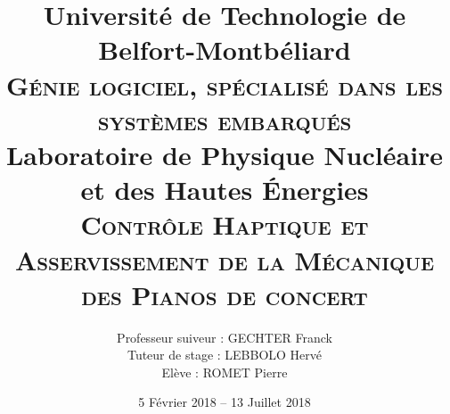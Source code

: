 \documentclass[french,a4paper,12pt]{report}
\begin{document}
\title{	Université de Technologie de Belfort-Montbéliard \\
		{\large \textsc{Génie logiciel, spécialisé dans les systèmes embarqués }} \\
		\vspace{1cm}
		Laboratoire de Physique Nucléaire et des Hautes Énergies \\
		{\large \textsc{Contrôle Haptique et Asservissement de la Mécanique des Pianos de concert }}		
	  }
	  
\date{5 Février 2018 -- 13 Juillet 2018 }
	  
\author{Professeur suiveur : GECHTER Franck  \\
		Tuteur de stage		: LEBBOLO Hervé  \\
		Elève				: ROMET Pierre
		}

\makeatletter
  \begin{titlepage}
  \centering
  \
      {\large \textsc{ }}\\
      \textsc{}\\
      
      \vfill
       {\LARGE \textbf{\@title}} \\
    	\vspace{2em}     
      

\end{titlepage}
\end{document}
